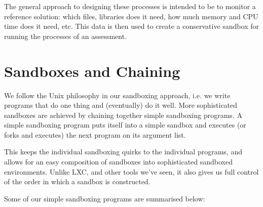 The general approach to designing these processes is intended to be to monitor
a reference solution: which files, libraries does it need, how much memory and
CPU time does it need, etc. This data is then used to create a conservative
sandbox for running the processes of an assessment.

\section{Sandboxes and Chaining}

We follow the Unix philosophy\cite{salus-1994} in our sandboxing approach, i.e.
we write programs that do one thing and (eventually) do it well. More
sophisticated sandboxes are achieved by chaining together simple sandboxing
programs. A simple sandboxing program puts itself into a simple sandbox and
executes (or forks and executes) the next program on its argument list.

This keeps the individual sandboxing quirks to the individual programs, and
allows for an easy composition of sandboxes into sophisticated sandboxed
environments. Unlike LXC, and other tools we've seen, it also gives us full
control of the order in which a sandbox is constructed.

Some of our simple sandboxing programs are summarised below:

